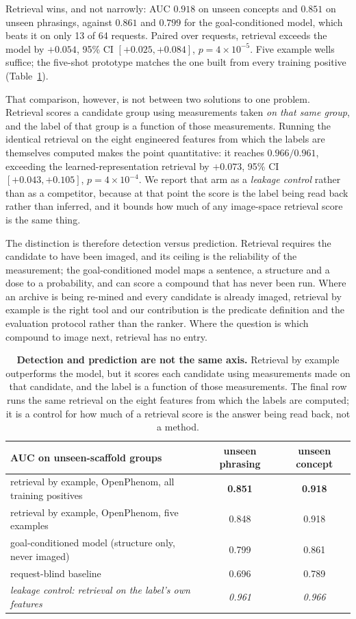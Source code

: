\documentclass[11pt]{article}
\begin{document}
Retrieval wins, and not narrowly: AUC $0.918$ on unseen concepts and $0.851$ on unseen
phrasings, against $0.861$ and $0.799$ for the goal-conditioned model, which beats it on
only 13 of 64 requests. Paired over requests, retrieval exceeds the model by $+0.054$,
95\% CI $[+0.025, +0.084]$, $p = 4\times10^{-5}$. Five example wells suffice; the
five-shot prototype matches the one built from every training positive
(Table~\ref{tab:retrieval}).

That comparison, however, is not between two solutions to one problem. Retrieval scores a
candidate group using measurements taken \emph{on that same group}, and the label of that
group is a function of those measurements. Running the identical retrieval on the eight
engineered features from which the labels are themselves computed makes the point
quantitative: it reaches $0.966/0.961$, exceeding the learned-representation retrieval by
$+0.073$, 95\% CI $[+0.043, +0.105]$, $p = 4\times10^{-4}$. We report that arm as a \emph{leakage control}
rather than as a competitor, because at that point the score is the label being read back
rather than inferred, and it bounds how much of any image-space retrieval score is the
same thing.

The distinction is therefore detection versus prediction. Retrieval requires the candidate
to have been imaged, and its ceiling is the reliability of the measurement; the
goal-conditioned model maps a sentence, a structure and a dose to a probability, and can
score a compound that has never been run. Where an archive is being re-mined and every
candidate is already imaged, retrieval by example is the right tool and our contribution is
the predicate definition and the evaluation protocol rather than the ranker. Where the
question is which compound to image next, retrieval has no entry.

\begin{table}[t]
\centering
\small
\begin{tabular}{lcc}
\toprule
AUC on unseen-scaffold groups & unseen phrasing & unseen concept \\
\midrule
retrieval by example, OpenPhenom, all training positives & \textbf{0.851} & \textbf{0.918} \\
retrieval by example, OpenPhenom, five examples & 0.848 & 0.918 \\
goal-conditioned model (structure only, never imaged) & 0.799 & 0.861 \\
request-blind baseline & 0.696 & 0.789 \\
\midrule
\textit{leakage control: retrieval on the label's own features} & \textit{0.961} & \textit{0.966} \\
\bottomrule
\end{tabular}
\caption{\textbf{Detection and prediction are not the same axis.} Retrieval by example
outperforms the model, but it scores each candidate using measurements made on that
candidate, and the label is a function of those measurements. The final row runs the same
retrieval on the eight features from which the labels are computed; it is a control for how
much of a retrieval score is the answer being read back, not a method.}
\label{tab:retrieval}
\end{table}
\end{document}
